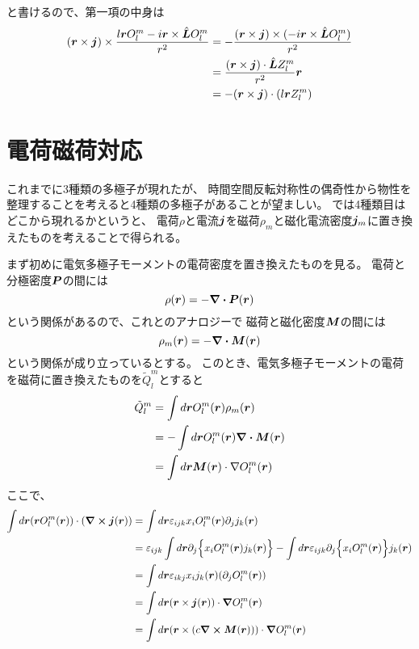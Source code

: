 \documentclass[../../master.tex]{subfiles}
\begin{document}
と書けるので、第一項の中身は
\begin{align}
    (\vb*{r}\times\vb*{j})\times\frac{l\vb*{r}O_l^m-i\vb*{r}\times \hat{\vb*{L}}O_l^m}{r^2}
    &=-\frac{(\vb*{r}\times\vb*{j})\times(-i\vb*{r}\times\hat{\vb*{L}}O_l^m)}{r^2}\\
    &= \frac{(\vb*{r}\times\vb*{j})\cdot\hat{\vb*{L}}Z_l^m}{r^2}\vb*{r}\\
    &=-(\vb*{r}\times \vb*{j})\cdot(l\vb*{r}Z_l^m)
\end{align}


\clearpage
\section{電荷磁荷対応}
これまでに3種類の多極子が現れたが、
時間空間反転対称性の偶奇性から物性を整理することを考えると4種類の多極子があることが望ましい。
では4種類目はどこから現れるかというと、
電荷\(\rho\)と電流\(\vb*{j}\)を磁荷\(\rho_m\)と磁化電流密度\(\vb*{j}_m\)に置き換えたものを考えることで得られる。

まず初めに電気多極子モーメントの電荷密度を置き換えたものを見る。
電荷と分極密度\(\vb*{P}\)の間には
\begin{equation}
    \rho(\vb*{r}) = -\div\vb*{P}(\vb*{r})
\end{equation}
という関係があるので、これとのアナロジーで
磁荷と磁化密度\(\vb*{M}\)の間には
\begin{equation}
    \rho_m(\vb*{r}) = -\div\vb*{M}(\vb*{r})
\end{equation}
という関係が成り立っているとする。
このとき、電気多極子モーメントの電荷を磁荷に置き換えたものを\(\tilde{Q}_l^m\)とすると
\begin{align}
    \tilde{Q}_l^m
    &= \int d\vb*{r} O_l^m(\vb*{r})\rho_m(\vb*{r})\\
    &= -\int d\vb*{r} O_l^m(\vb*{r})\div\vb*{M}(\vb*{r})\\
    &= \int d\vb*{r} \vb*{M}(\vb*{r})\cdot \nabla O_l^m(\vb*{r})
\end{align}
ここで、
\begin{align}
    \int d\vb*{r} (\vb*{r}O_l^m(\vb*{r}))\cdot(\curl \vb*{j}(\vb*{r}))
    &= \int d\vb*{r} \varepsilon_{ijk} x_i O_l^m(\vb*{r}) \partial_j j_k(\vb*{r})\\
    &= \varepsilon_{ijk} \int d\vb*{r} \partial_j \Bigl\{ x_i O_l^m(\vb*{r}) j_k(\vb*{r})\Bigr\}
    - \int d\vb*{r} \varepsilon_{ijk}\partial_j\Bigl\{x_i O_l^m(\vb*{r})\Bigr\} j_k(\vb*{r})\\
    &= \int d\vb*{r}\varepsilon_{ikj} x_i j_k(\vb*{r}) (\partial_j O_l^m(\vb*{r}))\\
    &= \int d\vb*{r} (\vb*{r}\times\vb*{j}(\vb*{r}))\cdot \grad O_l^m(\vb*{r})\\
    &= \int d\vb*{r} (\vb*{r}\times(c \curl \vb*{M}(\vb*{r})))\cdot \grad O_l^m(\vb*{r})\\
\end{align}
\end{document}
